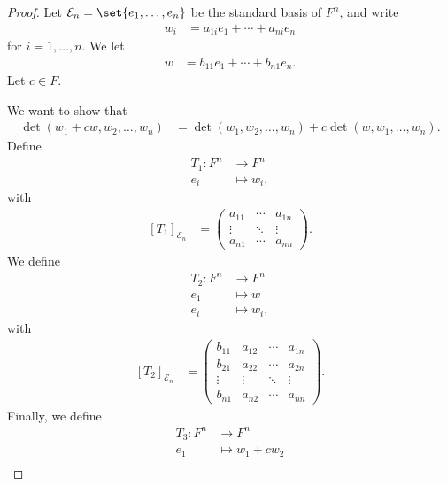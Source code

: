 \documentclass[10pt]{mypackage}
\begin{document}
    \begin{proof}
      Let $\mathcal{E}_{n} = \set{e_1,\dots,e_n}$ be the standard basis of $F^n$, and write
      \begin{align*}
        w_i &= a_{1i}e_{1} + \cdots + a_{ni}e_{n}
      \end{align*}
      for $i=1,\dots,n$. We let
      \begin{align*}
        w &= b_{11}e_1 + \cdots + b_{n1}e_n.
      \end{align*}
      Let $c\in F$.\newline

      We want to show that
      \begin{align*}
        \det\left(w_1 + cw,w_2,\dots,w_n\right) &= \det\left(w_1,w_2,\dots,w_n\right) + c\det\left(w,w_1,\dots,w_n\right).
      \end{align*}
      Define
      \begin{align*}
        T_1: F^n &\rightarrow F^n\\
        e_i&\mapsto w_i,
      \end{align*}
      with
      \begin{align*}
        \left[T_1\right]_{\mathcal{E}_n} &= \begin{pmatrix}a_{11} & \cdots & a_{1n} \\ \vdots & \ddots & \vdots \\ a_{n1} & \cdots & a_{nn}\end{pmatrix}.
      \end{align*}
      We define
      \begin{align*}
        T_{2}: F^{n} &\rightarrow F^n\\
        e_{1} &\mapsto w\\
        e_{i} &\mapsto w_{i},
      \end{align*}
      with
      \begin{align*}
        \left[T_2\right]_{\mathcal{E}_n} &= \begin{pmatrix}b_{11} & a_{12} & \cdots & a_{1n} \\ b_{21} & a_{22} & \cdots & a_{2n} \\ \vdots & \vdots & \ddots &\vdots \\ b_{n1} & a_{n2} & \cdots & a_{nn}\end{pmatrix}.
      \end{align*}
      Finally, we define
      \begin{align*}
        T_3: F^n &\rightarrow F^n\\
        e_{1} &\mapsto w_1 + cw_2\\

\end{align*}
\end{proof}
\end{document}
